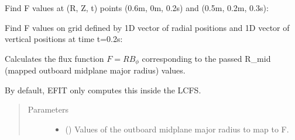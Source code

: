 \documentclass[letterpaper,10pt,english]{sphinxmanual}
\begin{document}
\begin{fulllineitems}
\begin{fulllineitems}
Find F values at (R, Z, t) points (0.6m, 0m, 0.2s) and (0.5m, 0.2m, 0.3s):

\begin{sphinxVerbatim}[commandchars=\\\{\}]
  \PYG{p}{[} \PYG{p}{]} \PYG{p}{[} \PYG{p}{]} \PYG{p}{[} \PYG{p}{]} 
\end{sphinxVerbatim}

Find F values on grid defined by 1D vector of radial positions 
and 1D vector of vertical positions  at time t=0.2s:

\begin{sphinxVerbatim}[commandchars=\\\{\}]
     
\end{sphinxVerbatim}

\end{fulllineitems}


\begin{fulllineitems}
\label{\detokenize{eqtools:eqtools.core.Equilibrium.rmid2F}}
Calculates the flux function \(F=RB_{\phi}\) corresponding to the passed R\_mid (mapped outboard midplane major radius) values.

By default, EFIT only computes this inside the LCFS.
\begin{quote}\begin{description}
\item[{Parameters}] \leavevmode\begin{itemize}
\item {} 
 () \textendash{} Values of the outboard midplane
major radius to map to F.


\end{itemize}
\end{description}
\end{quote}
\end{fulllineitems}
\end{fulllineitems}
\end{document}
